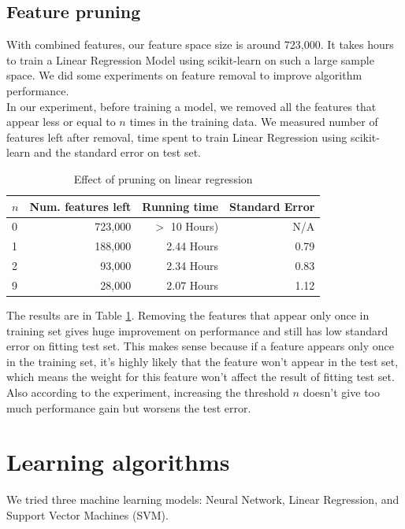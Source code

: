 \documentclass[journal]{IEEEtran}
\begin{document}
\subsection*{Feature pruning}
With combined features, our feature space size is around 723,000. It takes hours to train a Linear Regression Model using scikit-learn on such a large sample space. We did some experiments on feature removal to improve algorithm performance.
\\
In our experiment, before training a model, we removed all the features that appear less or equal to $n$ times in the training data. We measured number of features left after removal, time spent to train Linear Regression using scikit-learn and the standard error on test set.

\begin{table}[ht]
\caption{Effect of pruning on linear regression} %
\centering %
\begin{tabular}{l r r r} %
\hline\hline
$n$ & Num. features left & Running time & Standard Error  \\ [0.5ex] %
\hline
0 & 723,000 & $>$ 10 Hours) & N/A \\
1 & 188,000 & 2.44 Hours & 0.79 \\
2 & 93,000 & 2.34 Hours & 0.83 \\
9 & 28,000 & 2.07 Hours & 1.12 \\ [1ex]
\hline %
\end{tabular}
\label{table:featurepruning}
\end{table}

The results are in Table \ref{table:featurepruning}. Removing the features that
appear only once in training set gives huge improvement on performance and
still has low standard error on fitting test set. This makes sense because if a
feature appears only once in the training set, it's highly likely that the
feature won't appear in the test set, which means the weight for this feature
won't affect the result of fitting test set. Also according to the experiment,
increasing the threshold $n$ doesn't give too much performance gain but worsens
the test error.

\section{Learning algorithms}
We tried three machine learning models: Neural Network, Linear Regression, and
Support Vector Machines (SVM).
\end{document}
